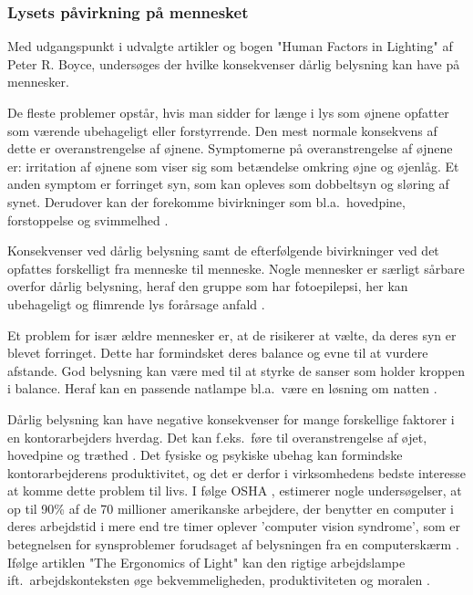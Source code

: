 \subsubsection{Lysets påvirkning på mennesket} 
\label{sec:konsekvenser}

Med udgangspunkt i udvalgte artikler og bogen "Human Factors in Lighting" af Peter R. Boyce, undersøges der hvilke konsekvenser dårlig belysning kan have på mennesker. 

De fleste problemer opstår, hvis man sidder for længe i lys som øjnene opfatter som værende ubehageligt eller forstyrrende. Den mest normale konsekvens af dette er overanstrengelse af øjnene. Symptomerne på overanstrengelse af øjnene er: irritation af øjnene som viser sig som betændelse omkring øjne og øjenlåg. Et anden symptom er forringet syn, som kan opleves som dobbeltsyn og sløring af synet. Derudover kan der forekomme bivirkninger som bl.a.\ hovedpine, forstoppelse og svimmelhed \cite{human_factors}.

Konsekvenser ved dårlig belysning samt de efterfølgende bivirkninger ved det opfattes forskelligt fra menneske til menneske. Nogle mennesker er særligt sårbare overfor dårlig belysning, heraf den gruppe som har fotoepilepsi, her kan ubehageligt og flimrende lys forårsage anfald \cite{human_factors}. 

Et problem for især ældre mennesker er, at de risikerer at vælte, da deres syn er blevet forringet. Dette har formindsket deres balance og evne til at vurdere afstande. God belysning kan være med til at styrke de sanser som holder kroppen i balance. Heraf kan en passende natlampe bl.a.\ være en løsning om natten \cite{human_factors}. 

Dårlig belysning kan have negative konsekvenser for mange forskellige faktorer i en kontorarbejders hverdag. Det kan f.eks.\ føre til overanstrengelse af øjet, hovedpine og træthed \cite{ergonomi_arbejdsplads}. Det fysiske og psykiske ubehag kan formindske kontorarbejderens produktivitet, og det er derfor i virksomhedens bedste interesse at komme dette problem til livs. I følge OSHA \cite{OSHA}, estimerer nogle undersøgelser, at op til 90\% af de 70 millioner amerikanske arbejdere, der benytter en computer i deres arbejdstid i mere end tre timer oplever 'computer vision syndrome', som er betegnelsen for synsproblemer forudsaget af belysningen fra en computerskærm \cite{CVS}. Ifølge artiklen "The Ergonomics of Light" kan den rigtige arbejdslampe ift.\ arbejdskonteksten øge bekvemmeligheden, produktiviteten og moralen \cite{ergonomi_arbejdsplads}. 